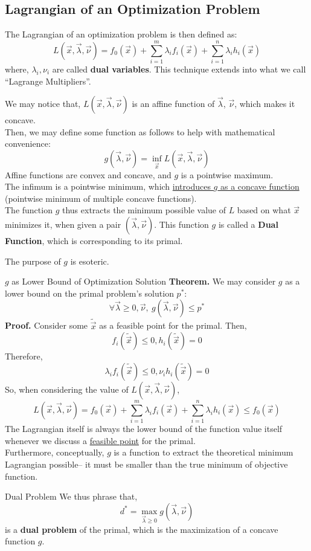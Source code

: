 \subsection{Lagrangian of an Optimization Problem}
The Lagrangian of an optimization problem is then defined as:
\[
    L(\vec{x}, \vec{\lambda}, \vec{\nu}) = f_0 (\vec{x}) + \sum_{i = 1}^m \lambda_i f_i (\vec{x}) + \sum_{i = 1}^n \lambda_i h_i (\vec{x})
\]
where, $\lambda_i, \nu_i$ are called \textbf{dual variables}. This technique extends into what we call ``Lagrange Multipliers''.

We may notice that, $L(\vec{x}, \vec{\lambda}, \vec{\nu})$ is an affine function of $\vec{\lambda}$, $\vec{\nu}$, which makes it concave. \\
Then, we may define some function as follows to help with mathematical convenience:
\[
    g(\vec{\lambda}, \vec{\nu}) = \inf_{\vec{x}} L(\vec{x}, \vec{\lambda}, \vec{\nu})
\]
Affine functions are convex and concave, and $g$ is a pointwise maximum. \\
The infimum is a pointwise minimum, which \underline{introduces $g$ as a concave function} (pointwise minimum of multiple concave functions). \\
The function $g$ thus extracts the minimum possible value of $L$ based on what $\vec{x}$ minimizes it, when given a pair $(\vec{\lambda}, \vec{\nu})$.
This function $g$ is called a \textbf{Dual Function}, which is corresponding to its primal.

The purpose of $g$ is esoteric.
\begin{ln-theorem}{$g$ as Lower Bound of Optimization Solution}{}
    \textbf{Theorem.} We may consider $g$ as a lower bound on the primal problem's solution $p^*$:
    \[
        \forall \vec{\lambda} \geq 0, \vec{\nu},\ g(\vec{\lambda}, \vec{\nu}) \leq p^*
    \]
    \tcblower
    \textbf{Proof.}
    Consider some $\tilde{\vec{x}}$ as a feasible point for the primal.
    Then,
    \[
        f_i (\tilde{\vec{x}}) \leq 0, h_i (\tilde{\vec{x}}) = 0
    \]
    Therefore,
    \[
        \lambda_i f_i (\tilde{\vec{x}}) \leq 0, \nu_i h_i (\tilde{\vec{x}}) = 0
    \]
    So, when considering the value of $L(\vec{x}, \vec{\lambda}, \vec{\nu})$,
    \[
        L(\vec{x}, \vec{\lambda}, \vec{\nu}) = f_0 (\vec{x}) + \sum_{i = 1}^m \lambda_i f_i (\vec{x}) + \sum_{i = 1}^n \lambda_i h_i (\vec{x}) \leq f_0 (\vec{x})
    \]
    The Lagrangian itself is always the lower bound of the function value itself whenever we discuss a \underline{feasible point} for the primal. \\
    Furthermore, conceptually, $g$ is a function to extract the theoretical minimum Lagrangian possible-- it must be smaller than the true minimum of objective function.
\end{ln-theorem}

\begin{ln-define}{Dual Problem}{}
    We thus phrase that,
    \[
        d^* = \max_{\vec{\lambda} \geq 0} g(\vec{\lambda}, \vec{\nu})
    \]
    is a \textbf{dual problem} of the primal, which is the maximization of a concave function $g$.
\end{ln-define}
